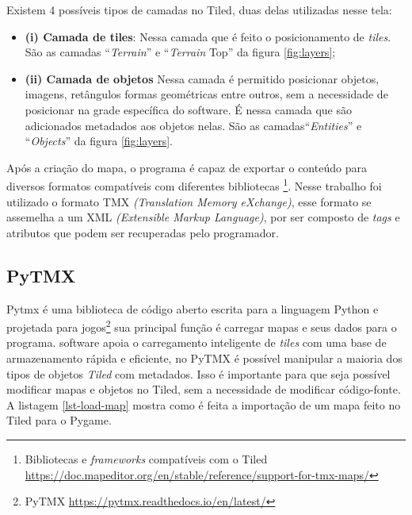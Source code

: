 Existem 4 possíveis tipos de camadas no Tiled, duas delas utilizadas nesse tela: 
\begin{itemize}
    \item \textbf{(i) Camada de tiles}: Nessa camada que é feito o posicionamento de \textit{tiles}. São as camadas ``\textit{Terrain}'' e ``\textit{Terrain} Top'' da figura \ref{fig:layers};
    \item \textbf{(ii) Camada de objetos}  Nessa camada é permitido posicionar objetos, imagens, retângulos formas geométricas entre outros, sem a necessidade de posicionar na grade específica do software. É nessa camada que são adicionados metadados aos objetos nelas. São as camadas``\textit{Entities}'' e ``\textit{Objects}'' da figura \ref{fig:layers}.
\end{itemize}


Após a criação do mapa, o programa é capaz de exportar o conteúdo para diversos formatos compatíveis com diferentes bibliotecas \footnote{Bibliotecas e \textit{frameworks} compatíveis com o Tiled \url{https://doc.mapeditor.org/en/stable/reference/support-for-tmx-maps/}}. Nesse trabalho foi utilizado o formato TMX \textit{(Translation Memory eXchange)}, esse formato se assemelha a um XML \textit{ (Extensible Markup Language)}, por ser composto de \textit{tags} e atributos que podem ser recuperadas pelo programador.


\subsection{PyTMX}
\label{sec:pytmx}
Pytmx é uma biblioteca de código aberto escrita para a linguagem Python e projetada para jogos\footnote{PyTMX \url{https://pytmx.readthedocs.io/en/latest/}} sua principal função é carregar mapas e seus dados para o programa. software apoia o carregamento inteligente de \textit{tiles} com uma base de armazenamento rápida e eficiente, no PyTMX é possível manipular a maioria dos tipos de objetos \textit{Tiled} com metadados. Isso é importante para que seja possível modificar mapas e objetos no Tiled, sem a necessidade de modificar código-fonte. A listagem \ref{lst-load-map} mostra como é feita a importação de um mapa feito no Tiled para o Pygame.

